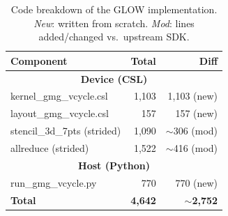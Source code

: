 \documentclass[conference]{IEEEtran}
\begin{document}
            \begin{table}[t]
                \caption{Code breakdown of the GLOW implementation. \textit{New}: written from scratch. \textit{Mod}: lines added/changed vs.\ upstream SDK.}
                \label{tab:code_breakdown}
                \centering
                \footnotesize
                \setlength{\tabcolsep}{3pt}
                \begin{tabular}{|l||r|r|} \hline
                    \textbf{Component}               & \textbf{Total} & \textbf{Diff} \\ \hline \hline
                    \multicolumn{3}{|c|}{\textbf{Device (CSL)}} \\ \hline \hline
                    \quad kernel\_gmg\_vcycle.csl    & 1,103          & 1,103 (new)   \\ \hline
                    \quad layout\_gmg\_vcycle.csl    & 157            & 157 (new)     \\ \hline
                    \quad stencil\_3d\_7pts (strided)   & 1,090          & ${\sim}$306 (mod) \\ \hline
                    \quad allreduce (strided)           & 1,522          & ${\sim}$416 (mod) \\ \hline \hline
                    \multicolumn{3}{|c|}{\textbf{Host (Python)}} \\ \hline \hline
                    \quad run\_gmg\_vcycle.py        & 770            & 770 (new)     \\ \hline \hline
                    \textbf{Total}                   & \textbf{4,642} & \textbf{${\sim}$2,752} \\ \hline
                \end{tabular}
            \end{table}
\end{document}
